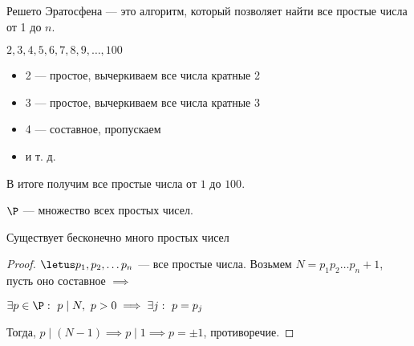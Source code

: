 \begin{defn}
    Решето Эратосфена --- это алгоритм, который позволяет найти все простые числа от 1 до $n$.

    $2, 3, 4, 5, 6, 7, 8, 9, \ldots, 100$

    \begin{itemize}
        \item 2 --- простое, вычеркиваем все числа кратные 2
        
        \item 3 --- простое, вычеркиваем все числа кратные 3
        
        \item 4 --- составное, пропускаем
        
        \item и т. д.
    \end{itemize}

    В итоге получим все простые числа от $1$ до $100$.
\end{defn}

\begin{notice}
    $\P$ --- множество всех простых чисел.
\end{notice}

\begin{theorem}
    Существует бесконечно много простых чисел
\end{theorem}

\begin{proof}

    $\letus p_1, p_2, \ldots p_n$ --- все простые числа. Возьмем $N = p_1 p_2 \ldots p_n + 1$, пусть оно составное $\implies$
    
    $\exists p \in \P :\ p \mid N,~ p > 0 \implies \exists j:\ p = p_j$
    
    Тогда, $p \mid (N - 1) \implies p \mid 1 \implies p = \pm 1$, противоречие.    
\end{proof}